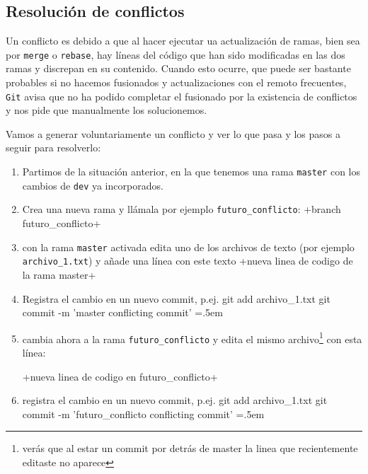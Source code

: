 \documentclass[a5paper,10pt]{article}
\newenvironment{cverbatim}
 {\SaveVerbatim{cverb}}
 {\endSaveVerbatim
  \flushleft\fboxrule=0pt\fboxsep=.5em
  \colorbox{bg}{\BUseVerbatim{cverb}}%
  \endflushleft
}
\begin{document}
  \subsection{Resolución de conflictos}
    Un conflicto es debido a que al hacer ejecutar ua actualización de ramas, bien sea por \verb+merge+ o \verb+rebase+, hay líneas del código que han sido modificadas en las dos ramas y discrepan en su contenido. Cuando esto ocurre, que puede ser bastante probables si no hacemos fusionados y actualizaciones con el remoto frecuentes, \verb+Git+ avisa que no ha podido completar el fusionado por la existencia de conflictos y nos pide que manualmente los solucionemos.
    
    Vamos a generar voluntariamente un conflicto y ver lo que pasa y los pasos a seguir para resolverlo:
    \begin{enumerate}
     \item Partimos de la situación anterior, en la que tenemos una rama \verb+master+ con los cambios de \verb+dev+ ya incorporados.
     
     \item Crea una nueva rama y llámala por ejemplo \verb+futuro_conflicto+:
     \cverb+branch futuro_conflicto+
     
     \item con la rama \verb+master+ activada edita uno de los archivos de texto (por ejemplo \verb+archivo_1.txt+) y añade una línea con este texto
     \cverb+nueva linea de codigo de la rama master+
     
     \item Registra el cambio en un nuevo commit, p.ej.
     \begin{cverbatim}
git add archivo_1.txt
git commit -m 'master conflicting commit'
     \end{cverbatim}

     \item cambia ahora a la rama \verb+futuro_conflicto+ y edita el mismo archivo\footnote{verás que al estar un commit por detrás de master la linea que recientemente editaste no aparece} con esta línea:
     
     \cverb+nueva linea de codigo en futuro_conflicto+
     
     \item registra el cambio en un nuevo commit, p.ej.
     \begin{cverbatim}
git add archivo_1.txt
git commit -m 'futuro_conflicto conflicting commit'
     \end{cverbatim}
     

\end{enumerate}
\end{document}
